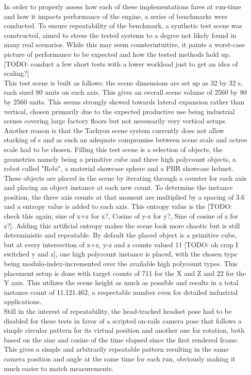 In order to properly assess how each of these implementations fares at run-time and how it impacts performance of the engine, a series of benchmarks were conducted. To ensure repeatability of the benchmark, a synthetic test scene was constructed, aimed to stress the tested systems to a degree not likely found in many real scenarios. While this may seem counterintuitive, it paints a worst-case picture of performance to be expected and how the tested methods hold up. [TODO: conduct a few short tests with a lower workload just to get an idea of scaling?] \\
This test scene is built as follows: the scene dimensions are set up as 32 by 32 s, each  sized 80 units on each axis. This gives an overall scene volume of 2560 by 80 by 2560 units. This seems strongly skewed towards lateral expansion rather than vertical, chosen primarily due to the expected productive use being industrial scenes covering large factory floors but not necessarily very vertical setups. Another reason is that the Tachyon scene  system currently does not allow stacking of s and as such an adequate compromise between scene scale and octree scale had to be chosen. 
Filling this test scene is a selection of objects, the geometries namely being a primitive cube and three high polycount objects, a robot called "Robi", a material showcase sphere and a PBR showcase helmet. These objects are placed in the scene by iterating through a counter for each axis and placing an object instance at each new count. To determine the instance position, the three axis counts at that moment are multiplied by a spacing of 3.6 and a entropy value is added to each axis. This entropy value is the [TODO: check this again; sine of x+z for x?, Cosine of y-z for y?, Sine of cosine of z for z?]. Adding this artificial entropy makes the scene look more chaotic but is still deterministic and repeatable. 
By default the placed object is a primitive cube, but at every intersection of x+z, y-z and z counts valued 11 [TODO: oh crap I switched y and z], one high polycount instance is placed, with the chosen type being modulo-index-incremented over the available high polycount types. 
This placement setup is done with target counts of 711 for the X and Z and 22 for the Y axis. This utilizes the scene height as much as possible and results in a total instance count of 11.121.462, a respectable number even for detailed industrial applications. \\
Still in the interest of repeatability, the head-tracked headset pose had to be disabled for these tests in favor of a scripted on-rails camera pose that follows a simple circular pattern for its virtual position and another one for rotation, both based on the sine and cosine of the time elapsed since the first rendered frame. This gives a simple and arbitrarily repeatable pattern resulting in the same camera position and angle at the same time for each run, obviously making it much easier to match measurements. \\

